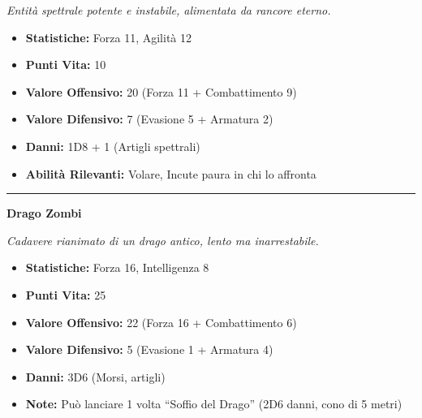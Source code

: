 \documentclass[../manuale_main.tex]{subfiles}
\begin{document}
\textit{Entità spettrale potente e instabile, alimentata da rancore eterno.}
\begin{itemize}
\item \textbf{Statistiche:} Forza 11, Agilità 12
\item \textbf{Punti Vita:} 10
\item \textbf{Valore Offensivo:} 20 (Forza 11 + Combattimento 9)
\item \textbf{Valore Difensivo:} 7 (Evasione 5 + Armatura 2)
\item \textbf{Danni:} 1D8 + 1 (Artigli spettrali)
\item \textbf{Abilità Rilevanti:} Volare, Incute paura in chi lo affronta
\end{itemize}
\vspace{0.2cm}
\noindent
\begin{center}
\rule{\textwidth}{0.4pt} 
\end{center}
\vspace{0.2cm}
{\zarafirtitlefont\Large\bfseries\noindent Drago Zombi}
\vspace{0.2cm}



\textit{Cadavere rianimato di un drago antico, lento ma inarrestabile.}
\begin{itemize}
\item \textbf{Statistiche:} Forza 16, Intelligenza 8
\item \textbf{Punti Vita:} 25
\item \textbf{Valore Offensivo:} 22 (Forza 16 + Combattimento 6)
\item \textbf{Valore Difensivo:} 5 (Evasione 1 + Armatura 4)
\item \textbf{Danni:} 3D6 (Morsi, artigli)
\item \textbf{Note:} Può lanciare 1 volta “Soffio del Drago” (2D6 danni, cono di 5 metri)
\end{itemize}
\end{document}
